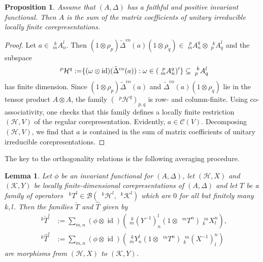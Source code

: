 \documentclass[12pt]{article}
\theoremstyle{change}
\newcommand{\co}{\mathrm{co}}
\DeclareMathOperator{\id}{id}
\newcommand{\Gr}[5]{\;{}^{\;#2}_{#4}#1_{#5}^{#3}}%
\newcommand{\Gru}[3]{\;{}^{\;#2}#1^{#3}}
\newtheorem{Lem}[Theorem]{Lemma}
\newtheorem{Prop}[Theorem]{Proposition}
\theoremstyle{definition}
\numberwithin{equation}{section}
\begin{document}
\begin{Prop} \label{prop:rep-weak-pw}
  Assume that $(A,\Delta)$ has a faithful and positive invariant
  functional. Then $A$ is the sum of the matrix coefficients of
unitary  irreducible locally finite corepresentations.
\end{Prop}
\begin{proof}
  Let $a \in \Gr{A}{k}{l}{m}{n}$. Then
  $(1 \otimes \rho_{p})\tilde \Delta^{\co}(a)(1 \otimes \rho_{q}) \in
  \Gr{A}{p}{q}{m}{n} \otimes \Gr{A}{k}{l}{p}{q}$ and the subspace
    \begin{align*}
    \Gru{\mathcal{H}}{p}{q} &:= \span \{ (\omega \otimes \id)(\tilde
    \Delta^{\co}(a)) : \omega \in (\Gr{A}{p}{q}{m}{n})' \} \subseteq
    \Gr{A}{k}{l}{p}{q}
  \end{align*}
  has finite dimension. Since $(1 \otimes \rho_{p})\tilde
  \Delta^{\co}(a)$ and $\tilde \Delta^{\co}(a)(1 \otimes \rho_{q})$
  lie in the tensor product $A \otimes A$, the family
  $(\Gru{\mathcal{H}}{p}{q})_{p,q}$ is row- and column-finite. Using
  co-associativity, one checks that this family defines a locally
  finite restriction $(\mathcal{H},V)$ of the regular
  corepresentation. Evidently, $a \in \mathcal{C}(V)$. Decomposing
  $(\mathcal{H},V)$, we find that
  $a$ is contained in the sum of matrix coefficients of unitary
  irreducible corepresentations.
\end{proof}
The key to the orthogonality relations is the following averaging procedure.
\begin{Lem} \label{lem:rep-average}
  Let $\phi$ be an invariant functional for $(A,\Delta)$, let
  $(\mathcal{H},X)$ and $(\mathcal{K},Y)$ be locally
  finite-dimensional corepresentations of $(A,\Delta)$ and let $T$ be
  a family of operators $\Gru{T}{k}{l} \in
  \mathcal{B}(\Gru{\mathcal{H}}{k}{l},\Gru{\mathcal{K}}{k}{l})$ which
  are $0$ for all but finitely many $k,l$. Then the families $\check T$ and
  $\hat T$ given by
  \begin{align*}
    \Gru{\check T}{k}{l} &:= \sum_{m,n} (\phi \otimes
    \id)(\Gr{(Y^{-1})}{k}{l}{m}{n}(1\otimes
    \Gru{T}{m}{n})\Gr{X}{m}{n}{k}{l}), \\
    \Gru{\hat T}{k}{l} &:= \sum_{m,n} (\phi \otimes
    \id)(\Gr{Y}{k}{l}{m}{n}(1\otimes
    \Gru{T}{m}{n})\Gr{(X^{-1})}{m}{n}{k}{l})
  \end{align*}
  are morphisms from $(\mathcal{H},X)$ to $(\mathcal{K},Y)$.
\end{Lem}
\end{document}

